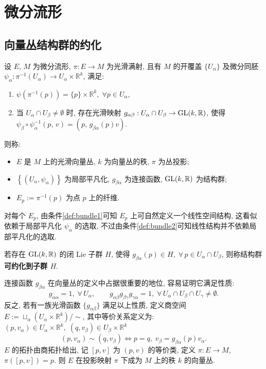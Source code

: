 \chapter{微分流形}
    \section{向量丛结构群的约化}
    \begin{definition}[向量丛的定义]
        设 $E$, $M$ 为微分流形, $\pi:E\rightarrow M$ 为光滑满射, 且有 $M$ 的开覆盖 $\{U_{\alpha}\}$ 
        及微分同胚 $\psi_{\alpha}:\pi^{-1}(U_{\alpha})\rightarrow U_{\alpha}\times\mathbb{R}^k$, 满足:
        \begin{enumerate}
            \item\label{def:bundle1} $\psi(\pi^{-1}(p))=\{p\}\times\mathbb{R}^k,\;\forall p\in U_{\alpha}$,
            \item\label{def:bundle2} 当 $U_{\alpha}\cap U_{\beta}\neq\emptyset$ 时, 存在光滑映射 $g_{\alpha\beta}:U_{\alpha}\cap U_{\beta}\rightarrow{\rm GL}(k,\mathbb{R})$, 使得 $\psi_{\beta}\circ\psi_{\alpha}^{-1}(p,\,v)=(p,\,g_{\beta\alpha}(p)v)$.
        \end{enumerate}
        则称:
        \begin{itemize}
            \item $E$ 是 $M$ 上的光滑向量丛, $k$ 为向量丛的秩, $\pi$ 为丛投影;
            \item $\left\{(U_{\alpha}, \psi_{\alpha})\right\}$ 为局部平凡化, $g_{\beta\alpha}$ 为连接函数, ${\rm GL}(k,\mathbb{R})$ 为结构群;
            \item $E_p:=\pi^{-1}(p)$ 为点 $p$ 上的纤维.
        \end{itemize}
        对每个 $E_p$, 由条件\ref{def:bundle1}可知 $E_p$ 上可自然定义一个线性空间结构, 这看似依赖于局部平凡化 $\psi_{\alpha}$ 的选取, 不过由条件\ref{def:bundle2}可知线性结构并不依赖局部平凡化的选取.
        
        若存在 ${\rm GL}(k,\mathbb{R})$ 的闭 {\rm Lie} 子群 $H$, 使得 $g_{\beta\alpha}(p)\in H,\;\forall\,p\in U_{\alpha}\cap U_{\beta}$, 则称结构群{\bf 可约化到子群 $H$}.
    \end{definition}

    连接函数 $g_{\beta\alpha}$ 在向量丛的定义中占据很重要的地位, 容易证明它满足性质:
    \begin{equation*}
        g_{\alpha\alpha} = 1,\;\forall\,U_{\alpha},\qquad g_{\alpha\beta}g_{\beta\gamma}g_{\gamma\alpha} = 1,\;\forall\,U_{\alpha}\cap U_{\beta}\cap U_{\gamma}\neq\emptyset.
    \end{equation*}
    反之, 若有一族光滑函数 $\{g_{\alpha\beta}\}$ 满足以上性质, 定义商空间 $E:=\sqcup_{\alpha}(U_{\alpha}\times\mathbb{R}^k)\big/\sim$, 其中等价关系定义为: $(p,v_{\alpha})\in U_{\alpha}\times\mathbb{R}^k,\;(q,v_{\beta})\in U_{\beta}\times\mathbb{R}^k$
    \begin{equation*}
        (p,v_{\alpha})\sim(q,v_{\beta})\Leftrightarrow p=q,\;v_{\beta}=g_{\beta\alpha}(p)v_{\alpha}.
    \end{equation*}
    $E$ 的拓扑由商拓扑给出, 记 $[p,v]$ 为 $(p,v)$ 的等价类, 定义 $\pi:E\rightarrow M$, $\pi([p,v])=p$. 则 $E$ 在投影映射 $\pi$ 下成为 $M$ 上的秩 $k$ 的向量丛.

